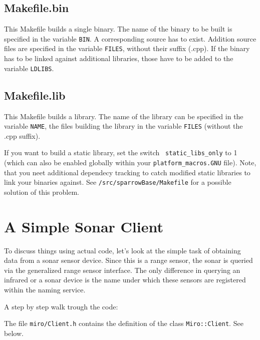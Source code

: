 \subsection{Makefile.bin}

This Makefile builds a single binary. The name of the binary to be
built is specified in the variable {\tt BIN}. A corresponding
source has to exist. Addition source files are specified in the
variable {\tt FILES}, without their suffix (.cpp). If the binary has
to be linked against additional libraries, those have to be added to the
variable {\tt LDLIBS}.


\subsection{Makefile.lib}

This Makefile builds a library. The name of the library can be
specified in the variable {\tt NAME}, the files building the
library in the variable {\tt FILES} (without the .cpp suffix).

If you want to build a static library, set the switch {\tt
  static\_libs\_only} to 1 (which can also be enabled globally within
your \texttt{platform\_macros.GNU} file). Note, that you neet
additional dependecy tracking to catch modified static libraries to
link your binaries against. See \texttt{/src/sparrowBase/Makefile} for
a possible solution of this problem.

\section{A Simple Sonar Client}

To discuss things using actual code, let's look at the simple task of
obtaining data from a sonar sensor device. Since this is a range
sensor, the sonar is queried via the generalized range sensor
interface. The only difference in querying an infrared or a sonar
device is the name under which these sensors are registered within the
naming service.



A step by step walk trough the code:



The file \lstinline!miro/Client.h! contains the definition of the class
\lstinline!Miro::Client!. See below.



